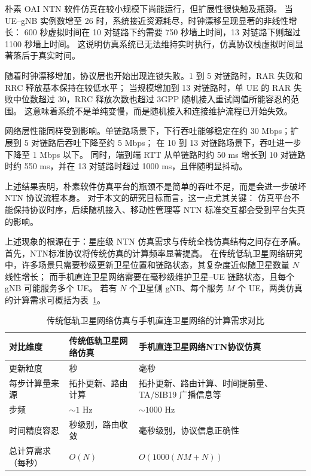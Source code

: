 朴素 OAI NTN 软件仿真在较小规模下尚能运行，但扩展性很快触及瓶颈。
当 UE--gNB 实例数增至 26 时，系统接近资源耗尽，时钟漂移呈现显著的非线性增长：
600 秒虚拟时间在 10 对链路下约需要 750 秒墙上时间，13 对链路下则超过 1100 秒墙上时间。
这说明仿真系统已无法维持实时执行，仿真协议栈虚拟时间显著落后于真实时间。

随着时钟漂移增加，协议层也开始出现连锁失败。1 到 5 对链路时，RAR 失败和 RRC 释放基本保持在较低水平；
当规模增加到 13 对链路时，单 UE 的 RAR 失败中位数超过 30，RRC 释放次数也超过 3GPP 随机接入重试阈值所能容忍的范围。
这意味着系统不是单纯变慢，而是随机接入和连接维护流程已开始失效。

网络层性能同样受到影响。单链路场景下，下行吞吐能够稳定在约 30 Mbps；扩展到 5 对链路后吞吐下降至约 5 Mbps；
在 10 到 13 对链路场景下，吞吐进一步下降至 1 Mbps 以下。
同时，端到端 RTT 从单链路时约 50 ms 增长到 10 对链路时约 550 ms，并在 13 对链路时超过 1000 ms，且伴随明显抖动。

上述结果表明，朴素软件仿真平台的瓶颈不是简单的吞吐不足，而是会进一步破坏 NTN 协议流程本身。
对于本文的研究目标而言，这一点尤其关键：
仿真平台不能保持协议时序，后续随机接入、移动性管理等 NTN 标准交互都会受到平台失真的影响。


上述现象的根源在于：星座级 NTN 仿真需求与传统全栈仿真结构之间存在矛盾。
首先，NTN标准协议将传统仿真的计算频率显著提高。
在传统低轨卫星网络研究中，许多场景只需要秒级更新卫星位置和链路状态，其复杂度近似随卫星数量 $N$ 线性增长；
而手机直连卫星网络需要在毫秒级维护卫星--UE 链路状态，且每个 gNB 可能服务多个 UE。
若有 $N$ 个卫星侧 gNB、每个服务 $M$ 个 UE，两类仿真的计算需求可概括为表~\ref{tab_ntn_update_complexity}。

\begin{table}[H]
    \renewcommand{\arraystretch}{1.25}
    \centering\wuhao
    \caption{传统低轨卫星网络仿真与手机直连卫星网络的计算需求对比} \label{tab_ntn_update_complexity} \vspace{2mm}
    \begin{tabularx}{\textwidth} {
        >{\centering\arraybackslash}p{}
        >{\centering\arraybackslash}X
        >{\centering\arraybackslash}X
    }
    \toprule[1.5pt]
        \textbf{对比维度} & \textbf{传统低轨卫星网络仿真} & \textbf{手机直连卫星网络NTN协议仿真} \\
    \midrule[1pt]
        更新粒度 & 秒 & 毫秒 \\
        每步计算量来源 & 拓扑更新、路由计算 & 拓扑更新、路由计算、时间提前量、TA/SIB19 广播信息等 \\
        步频 & $\sim 1$ Hz & $\sim 1000$ Hz \\
        时间精度容忍 & 秒级别，路由收敛 & 毫秒级别，协议信息正确性 \\
        总计算需求（每秒） & $O(N)$ & $O(1000(NM+N))$ \\
    \bottomrule[1.5pt]
    \end{tabularx}
\end{table}

